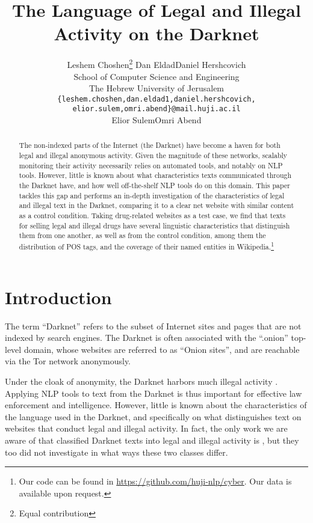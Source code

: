 \documentclass[11pt,a4paper,table]{article}
\title{The Language of Legal and Illegal Activity on the Darknet}
\author{
	Leshem Choshen\thanks{\quad Equal contribution} \And Dan Eldad\footnotemark[1] \And Daniel Hershcovich\footnotemark[1]\\	
	School of Computer Science and Engineering \\
	The Hebrew University of Jerusalem \\
	\texttt{\{leshem.choshen,dan.eldad1,daniel.hershcovich,} \\
	\texttt{elior.sulem,omri.abend\}@mail.huji.ac.il}\\
	\And Elior Sulem\footnotemark[1]\And  Omri Abend \\
}
\date{}
\begin{document}
\maketitle

\begin{abstract}
  The non-indexed parts of the Internet (the Darknet)
   have become a haven for both legal and illegal anonymous activity.
  Given the magnitude of these networks, scalably monitoring their activity necessarily relies
    on automated tools, and notably on NLP tools.
  However, little is known about what characteristics texts communicated through the Darknet have, 
  and how well off-the-shelf NLP tools do on this domain.
  This paper tackles this gap and performs an in-depth investigation of the characteristics
    of legal and illegal text in the Darknet, comparing it to a clear net website with similar
    content as a control condition.
  Taking drug-related websites as a test case, we find that texts for selling legal and illegal drugs
    have several linguistic characteristics that distinguish them from one another, as well as from 
    the control condition, among them the distribution of POS tags, and the coverage of their named entities in Wikipedia.\footnote{Our code can be found in \url{https://github.com/huji-nlp/cyber}. Our data is available upon request.}
\end{abstract}



\section{Introduction}



  The term ``Darknet'' refers to the subset of Internet sites and pages that are not indexed by search engines.
  The Darknet is often associated with the ``.onion'' top-level domain, whose
  websites are referred to as ``Onion sites'', and are reachable via the Tor network anonymously.
  
  Under the cloak of anonymity, the Darknet harbors much illegal activity \citep{moore2016cryptopolitik}.
  Applying NLP tools to text from the Darknet is thus important for effective law enforcement and intelligence.
  However, little is known about the characteristics of the language used in the Darknet, 
  and specifically on what distinguishes text on websites that conduct legal and illegal activity.
	In fact, the only work we are aware of that classified Darknet texts into legal and illegal activity is \citet{Avarikioti18},
	but they too did not investigate in what ways these two classes differ.
  
\end{document}
